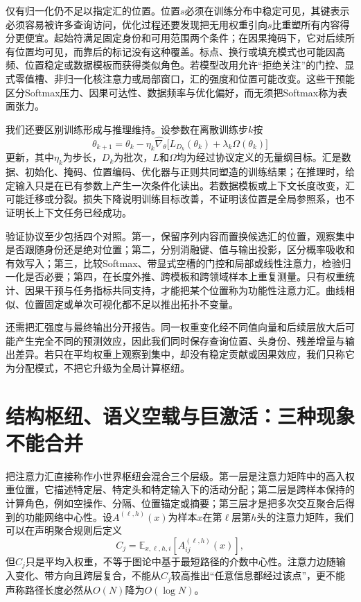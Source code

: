 仅有归一化仍不足以指定汇的位置。位置$s$必须在训练分布中稳定可见，其键表示必须容易被许多查询访问，优化过程还要发现把无用权重引向$s$比重塑所有内容得分更便宜。起始符满足固定身份和可用范围两个条件；在因果掩码下，它对后续所有位置均可见，而靠后的标记没有这种覆盖。标点、换行或填充模式也可能因高频、位置稳定或数据模板而获得类似角色。若模型改用允许“拒绝关注”的门控、显式零值槽、非归一化核注意力或局部窗口，汇的强度和位置可能改变。这些干预能区分Softmax压力、因果可达性、数据频率与优化偏好，而无须把Softmax称为表面张力。

我们还要区别训练形成与推理维持。设参数在离散训练步$k$按
\begin{equation}
 \theta_{k+1}=\theta_k-\eta_k\widehat\nabla_\theta
 \bigl[L_{D_k}(\theta_k)+\lambda_k\Omega(\theta_k)\bigr]
\end{equation}
更新，其中$\eta_k$为步长，$D_k$为批次，$L$和$\Omega$均为经过协议定义的无量纲目标。汇是数据、初始化、掩码、位置编码、优化器与正则共同塑造的训练结果；在推理时，给定输入只是在已有参数上产生一次条件化读出。若数据模板或上下文长度改变，汇可能迁移或分裂。损失下降说明训练目标改善，不证明该位置是全局参照系，也不证明长上下文任务已经成功。

验证协议至少包括四个对照。第一，保留序列内容而置换候选汇的位置，观察集中是否跟随身份还是绝对位置；第二，分别消融键、值与输出投影，区分概率吸收和有效写入；第三，比较Softmax、带显式空槽的门控和局部或线性注意力，检验归一化是否必要；第四，在长度外推、跨模板和跨领域样本上重复测量。只有权重统计、因果干预与任务指标共同支持，才能把某个位置称为功能性注意力汇。曲线相似、位置固定或单次可视化都不足以推出拓扑不变量。

还需把汇强度与最终输出分开报告。同一权重变化经不同值向量和后续层放大后可能产生完全不同的预测效应，因此我们同时保存查询位置、头身份、残差增量与输出差异。若只在平均权重上观察到集中，却没有稳定贡献或因果效应，我们只称它为分配模式，不把它升级为全局计算枢纽。

\section{结构枢纽、语义空载与巨激活：三种现象不能合并}
\label{sec:geometric_hubs}

把注意力汇直接称作小世界枢纽会混合三个层级。第一层是注意力矩阵中的高入权重位置，它描述特定层、特定头和特定输入下的活动分配；第二层是跨样本保持的计算角色，例如空操作、分隔、位置锚定或摘要；第三层才是把多次交互聚合后得到的功能网络中心性。设$A^{(\ell,h)}(x)$为样本$x$在第$\ell$层第$h$头的注意力矩阵，我们可以在声明聚合规则后定义
\begin{equation}
 C_j=\mathbb{E}_{x,\ell,h,i}\left[A^{(\ell,h)}_{ij}(x)\right],
\end{equation}
但$C_j$只是平均入权重，不等于图论中基于最短路径的介数中心性。注意力边随输入变化、带方向且跨层复合，不能从$C_j$较高推出“任意信息都经过该点”，更不能声称路径长度必然从$O(N)$降为$O(\log N)$。

